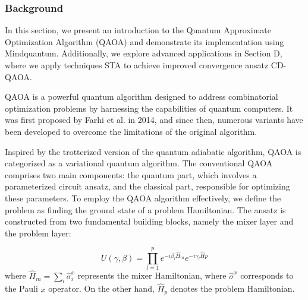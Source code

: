 


\subsubsection{Background}

In this section, we present an introduction to the Quantum Approximate Optimization Algorithm (QAOA) and demonstrate its implementation using Mindquantum. Additionally, we explore advanced applications in Section D, where we apply techniques STA to achieve improved convergence ansatz CD-QAOA\cite{PhysRevResearch.4.013141}.


QAOA is a powerful quantum algorithm designed to address combinatorial optimization problems by harnessing the capabilities of quantum computers. It was first proposed by Farhi et al. in 2014\cite{farhi2014quantum}, and since then, numerous variants have been developed to overcome the limitations of the original algorithm.

Inspired by the trotterized version of the quantum adiabatic algorithm, QAOA is categorized as a variational quantum algorithm. The conventional QAOA comprises two main components: the quantum part, which involves a parameterized circuit ansatz, and the classical part, responsible for optimizing these parameters. To employ the QAOA algorithm effectively, we define the problem as finding the ground state of a problem Hamiltonian. The ansatz is constructed from two fundamental building blocks, namely the mixer layer and the problem layer:

\begin{equation}
U(\gamma, \beta) = \prod_{l=1}^p e^{-i\beta_l \hat{H}_{m}}e^{-i\gamma_l\hat{H}{{p}}}
\end{equation}
where $\hat{H}_{{m}} = \sum_i \hat{\sigma}^x_i$ represents the mixer Hamiltonian, where $\hat{\sigma}^x$ corresponds to the Pauli $x$ operator. On the other hand, $\hat{H}_{{p}}$ denotes the problem Hamiltonian.

